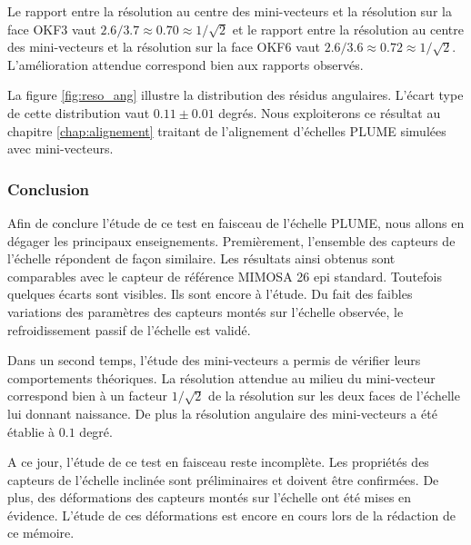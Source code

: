   Le rapport entre la r\'esolution au centre des mini-vecteurs et la r\'esolution sur la face OKF3 vaut $2.6/3.7 \approx 0.70 \approx 1/\sqrt{2} $ et le rapport entre la r\'esolution au centre des mini-vecteurs et la r\'esolution sur la face OKF6 vaut $2.6/3.6 \approx 0.72 \approx 1/\sqrt{2}$. L'am\'elioration attendue correspond bien aux rapports observ\'es.
  
  \medskip
  
  La figure \ref{fig:reso_ang} illustre la distribution des r\'esidus angulaires. L'\'ecart type de cette distribution vaut $0.11 \pm  0.01$ degr\'es. Nous exploiterons ce r\'esultat au chapitre \ref{chap:alignement} traitant de l'alignement d'\'echelles PLUME simul\'ees avec mini-vecteurs.

  \FloatBarrier
  
  \subsubsection{Conclusion}
  
  Afin de conclure l'\'etude de ce test en faisceau de l'\'echelle PLUME, nous allons en d\'egager les principaux enseignements. Premi\`erement, l'ensemble des capteurs de l'\'echelle r\'epondent de façon similaire. Les r\'esultats ainsi obtenus sont comparables avec le capteur de r\'ef\'erence MIMOSA 26 epi standard. Toutefois quelques \'ecarts sont visibles. Ils sont encore \`a l'\'etude. Du fait des faibles variations des param\`etres des capteurs mont\'es sur l'\'echelle observ\'ee, le refroidissement passif de l'\'echelle est valid\'e.
  
  \medskip
  
  Dans un second temps, l'\'etude des mini-vecteurs a permis de v\'erifier leurs comportements th\'eoriques. La r\'esolution attendue au milieu du mini-vecteur correspond bien \`a un facteur $1/\sqrt{2}$ de la r\'esolution sur les deux faces de l'\'echelle lui donnant naissance. De plus la r\'esolution angulaire des mini-vecteurs a \'et\'e \'etablie \`a $0.1$ degr\'e.

  \medskip
  
  A ce jour, l'\'etude de ce test en faisceau reste incompl\`ete. Les propri\'et\'es des capteurs de l'\'echelle inclin\'ee sont pr\'eliminaires et doivent \^etre confirm\'ees. De plus, des d\'eformations des capteurs mont\'es sur l'\'echelle ont \'et\'e mises en \'evidence. L'\'etude de ces d\'eformations est encore en cours lors de la r\'edaction de ce m\'emoire. 
  
